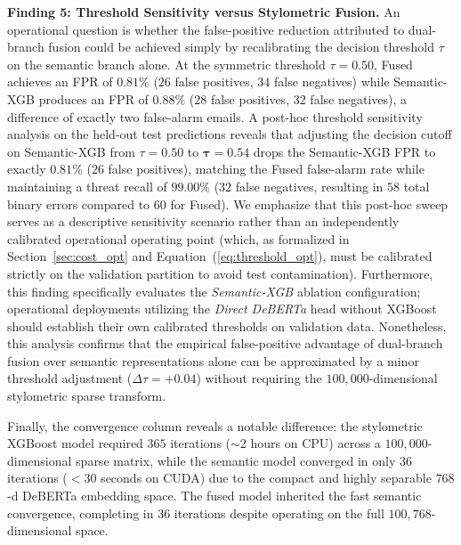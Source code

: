 \documentclass[journal]{IEEEtran}
\begin{document}
\textbf{Finding 5: Threshold Sensitivity versus Stylometric Fusion.} An operational question is whether the false-positive reduction attributed to dual-branch fusion could be achieved simply by recalibrating the decision threshold $\tau$ on the semantic branch alone. At the symmetric threshold $\tau = 0.50$, Fused achieves an FPR of $0.81\%$ ($26$ false positives, $34$ false negatives) while Semantic-XGB produces an FPR of $0.88\%$ ($28$ false positives, $32$ false negatives), a difference of exactly two false-alarm emails. A post-hoc threshold sensitivity analysis on the held-out test predictions reveals that adjusting the decision cutoff on Semantic-XGB from $\tau = 0.50$ to $\mathbf{\tau = 0.54}$ drops the Semantic-XGB FPR to exactly $\mathbf{0.81\%}$ ($26$ false positives), matching the Fused false-alarm rate while maintaining a threat recall of $\mathbf{99.00\%}$ ($32$ false negatives, resulting in $58$ total binary errors compared to $60$ for Fused). We emphasize that this post-hoc sweep serves as a descriptive sensitivity scenario rather than an independently calibrated operational operating point (which, as formalized in Section~\ref{sec:cost_opt} and Equation~(\ref{eq:threshold_opt}), must be calibrated strictly on the validation partition to avoid test contamination). Furthermore, this finding specifically evaluates the \emph{Semantic-XGB} ablation configuration; operational deployments utilizing the \emph{Direct DeBERTa} head without XGBoost should establish their own calibrated thresholds on validation data. Nonetheless, this analysis confirms that the empirical false-positive advantage of dual-branch fusion over semantic representations alone can be approximated by a minor threshold adjustment ($\Delta \tau = +0.04$) without requiring the $100,000$-dimensional stylometric sparse transform.

Finally, the convergence column reveals a notable difference: the stylometric XGBoost model required $365$ iterations ($\sim$2 hours on CPU) across a $100,000$-dimensional sparse matrix, while the semantic model converged in only $36$ iterations ($<$30 seconds on CUDA) due to the compact and highly separable $768$-d DeBERTa embedding space. The fused model inherited the fast semantic convergence, completing in $36$ iterations despite operating on the full $100,768$-dimensional space.
\end{document}
